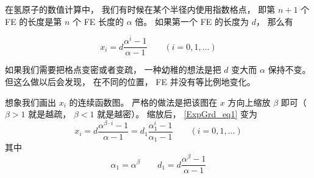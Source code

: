 

在氢原子的数值计算中， 我们有时候在某个半径内使用指数格点， 即第 $n+1$ 个 FE 的长度是第 $n$ 个 FE 长度的 $\alpha$ 倍。 如果第一个 FE 的长度为 $d$， 那么有

\begin{equation}\label{ExpGrd_eq1}
x_i = d \frac{\alpha^i - 1}{\alpha - 1}
\qquad (i = 0, 1, \dots)
\end{equation}

如果我们需要把格点变密或者变疏， 一种幼稚的想法是把 $d$ 变大而 $\alpha$ 保持不变。 但这么做以后会发现， 在不同的位置， FE 并没有等比例地变化。

想象我们画出 $x_i$ 的连续函数图。 严格的做法是把该图在 $x$ 方向上缩放 $\beta$ 即可（$\beta > 1$ 就是越疏， $\beta < 1$ 就是越密）。 缩放后， \autoref{ExpGrd_eq1} 变为
\begin{equation}
x_i = d \frac{\alpha^{\beta \cdot i} - 1}{\alpha - 1}
= d_1 \frac{\alpha_1^i - 1}{\alpha_1 - 1}
\qquad (i = 0, 1, \dots)
\end{equation}
其中
\begin{equation}
\alpha_1 = \alpha^\beta
\qquad
d_1 = d \frac{{\alpha^\beta - 1}}{\alpha - 1}
\end{equation}
